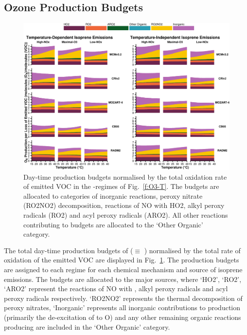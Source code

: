 \subsection{Ozone Production Budgets} \label{ss:r_budgets}

\begin{figure}[t]%
    \centering%
    \caption{Day-time  production budgets normalised by the total oxidation rate of emitted VOC in the -regimes of Fig.~\ref{f:O3-T}. The budgets are allocated to categories of inorganic reactions, peroxy nitrate (RO2NO2) decomposition, reactions of NO with HO2, alkyl peroxy radicals (RO2) and acyl peroxy radicals (ARO2). All other reactions contributing to  budgets are allocated to the `Other Organic' category.}%
    \label{f:ozone_budgets}%
    \includegraphics[width=\textwidth]{img/Ox_budgets}
\end{figure}

The total day-time production budgets of  ($\equiv$ ) normalised by the total rate of oxidation of the emitted VOC are displayed in Fig.~\ref{f:ozone_budgets}.
The  production budgets are assigned to each  regime for each chemical mechanism and source of isoprene emissions.
The budgets are allocated to the major sources, where `HO2', `RO2', `ARO2' represent the reactions of NO with , alkyl peroxy radicals and acyl peroxy radicals respectively.
`RO2NO2' represents the thermal decomposition of peroxy nitrates, `Inorganic' represents all inorganic contributions to  production (primarily the de-excitation of  to O) and any other remaining organic reactions producing  are included in the `Other Organic' category.

